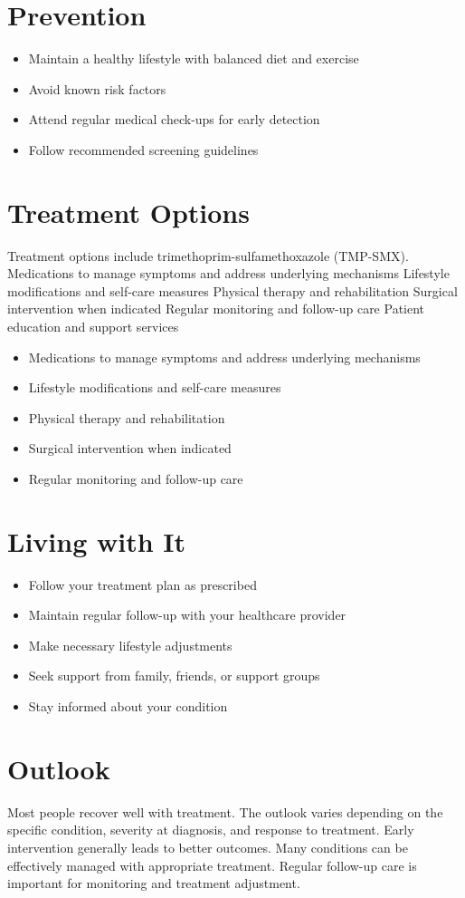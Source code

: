 \section{Prevention}
\begin{itemize}[noitemsep]
  \item Maintain a healthy lifestyle with balanced diet and exercise
  \item Avoid known risk factors
  \item Attend regular medical check-ups for early detection
  \item Follow recommended screening guidelines
\end{itemize}
\section{Treatment Options}
Treatment options include trimethoprim-sulfamethoxazole (TMP-SMX). Medications to manage symptoms and address underlying mechanisms Lifestyle modifications and self-care measures Physical therapy and rehabilitation Surgical intervention when indicated Regular monitoring and follow-up care Patient education and support services

\begin{itemize}[noitemsep]
  \item Medications to manage symptoms and address underlying mechanisms
  \item Lifestyle modifications and self-care measures
  \item Physical therapy and rehabilitation
  \item Surgical intervention when indicated
  \item Regular monitoring and follow-up care
\end{itemize}
\section{Living with It}
\begin{itemize}[noitemsep]
  \item Follow your treatment plan as prescribed
  \item Maintain regular follow-up with your healthcare provider
  \item Make necessary lifestyle adjustments
  \item Seek support from family, friends, or support groups
  \item Stay informed about your condition
\end{itemize}
\section{Outlook}
Most people recover well with treatment. The outlook varies depending on the specific condition, severity at diagnosis, and response to treatment. Early intervention generally leads to better outcomes. Many conditions can be effectively managed with appropriate treatment. Regular follow-up care is important for monitoring and treatment adjustment.
